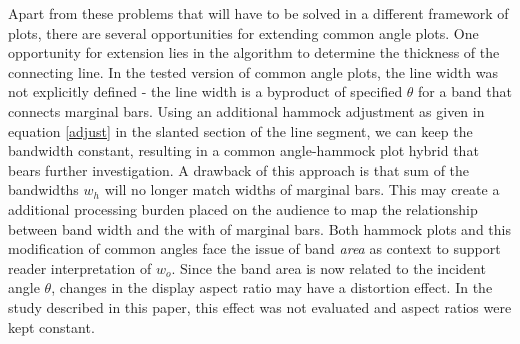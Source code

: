 \documentclass[journal]{vgtc}\usepackage{graphicx, color}
\begin{document}

Apart from these problems that will have to be solved in a different framework of plots, there are several opportunities for extending common angle plots.
One opportunity for extension lies in the algorithm to determine the thickness of the connecting line. In the
tested version of common angle plots, the line width was not explicitly defined - the line width is a byproduct of 
specified $\theta$ for a band that connects marginal bars. Using an additional hammock adjustment as given in equation \ref{adjust} in the slanted section of the line segment, we can keep the bandwidth constant, resulting in a  common angle-hammock plot hybrid that bears further investigation.
A drawback of this approach is that sum of the bandwidths $w_h$ will no longer match widths of marginal bars. 
This may create a additional processing burden placed on the audience to map the relationship between 
band width and the with of marginal bars. 
Both hammock plots and  this modification of common angles face  
the issue of band \emph{area} as context to support reader interpretation of $w_o$. Since the band
area is now related to the incident angle $\theta$, changes in the display aspect ratio may have a distortion 
effect. In the study described in this paper, this effect was not evaluated and aspect ratios were kept constant.
\end{document}
